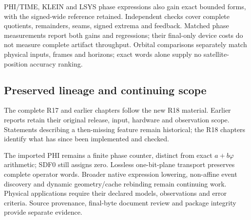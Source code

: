 PHI/TIME, KLEIN and LSYS phase expressions also gain exact bounded forms,
with the signed-wide reference retained. Independent checks cover complete
quotients, remainders, seams, signed extrema and feedback. Matched phase
measurements report both gains and regressions; their final-only device
costs do not measure complete artifact throughput. Orbital comparisons
separately match physical inputs, frames and horizons; exact words alone
supply no satellite-position accuracy ranking.

\subsection*{Preserved lineage and continuing scope}
The complete R17 and earlier chapters follow the new R18 material. Earlier
reports retain their original release, input, hardware and observation
scope. Statements describing a then-missing feature remain historical;
the R18 chapters identify what has since been implemented and checked.

The imported PHI remains a finite phase counter, distinct from exact
$a+b\varphi$ arithmetic; SDF0 still assigns zero. Lossless one-bit-plane
transport preserves complete operator words. Broader native expression
lowering, non-affine event discovery and dynamic geometry/cache rebinding
remain continuing work. Physical applications require their declared
models, observations and error criteria. Source provenance, final-byte
document review and package integrity provide separate evidence.
\clearpage
